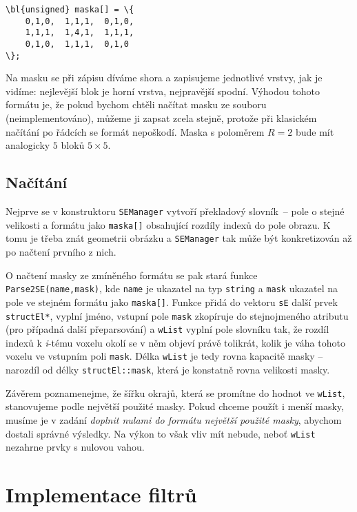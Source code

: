    \begin{Verbatim}[commandchars = \\\{\}]
\bl{unsigned} maska[] = \{
    0,1,0,  1,1,1,  0,1,0,
    1,1,1,  1,4,1,  1,1,1,
    0,1,0,  1,1,1,  0,1,0
\};
    \end{Verbatim}

    Na masku se při zápisu díváme shora a zapisujeme jednotlivé vrstvy, jak je vidíme: nejlevější blok je horní vrstva, nejpravější spodní. Výhodou tohoto formátu je, že pokud bychom chtěli načítat masku ze souboru (neimplementováno), můžeme ji zapsat zcela stejně, protože při klasickém načítání po řádcích se formát nepoškodí. Maska s poloměrem $R = 2$ bude mít analogicky $5$ bloků $5\times 5$.

    \subsection{Načítání}

     Nejprve se v konstruktoru {\tt SEManager} vytvoří překladový \bq slovník\eq~-- pole o stejné velikosti a formátu jako {\tt maska[]} obsahující rozdíly indexů do pole obrazu. K tomu je třeba znát geometrii obrázku a {\tt SEManager} tak může být konkretizován až po načtení prvního z nich.

     O načtení masky ze zmíněného formátu se pak stará funkce {\tt Parse2SE(name,mask)}, kde {\tt name} je ukazatel na typ {\tt string} a {\tt mask} ukazatel na pole ve stejném formátu jako {\tt maska[]}. Funkce přidá do vektoru {\tt sE} další prvek {\tt structEl*}, vyplní jméno, vstupní pole {\tt mask} zkopíruje do stejnojmeného atributu (pro případná další přeparsování) a {\tt wList} vyplní pole slovníku tak, že rozdíl indexů k \textit{i}-tému voxelu okolí se v něm objeví právě tolikrát, kolik je váha tohoto voxelu ve vstupním poli {\tt mask}. Délka {\tt wList} je tedy rovna kapacitě masky -- narozdíl od délky {\tt structEl::mask}, která je konstatně rovna velikosti masky.

     Závěrem poznamenejme, že šířku okrajů, která se promítne do hodnot ve {\tt wList}, stanovujeme podle největší použité masky. Pokud chceme použít i menší masky, musíme je v zadání \emph{doplnit nulami do formátu největší použité masky}, abychom dostali správné výsledky. Na výkon to však vliv mít nebude, neboť {\tt wList} nezahrne prvky s nulovou vahou.

    \section{Implementace filtrů}


